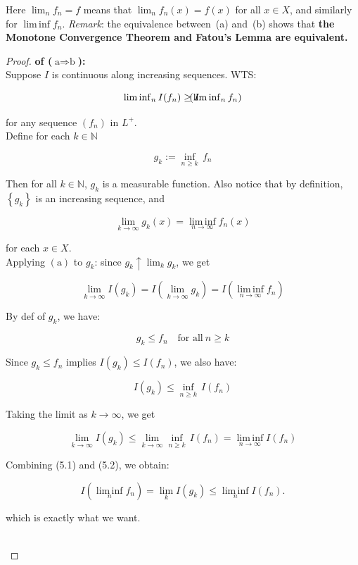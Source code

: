\documentclass{qlnotes-export}
\begin{document}
Here \(\lim_{n}f_{n} = f\) means that \(\lim_{n}f_{n}(x) = f(x)\) for all \(x \in X\), and similarly for \(\operatorname{lim\, inf}f_{n}\). \emph{Remark}: the equivalence between~(a) and~(b) shows that \textbf{the Monotone Convergence Theorem and Fatou's Lemma are equivalent.}

\begin{proof}

\textbf{of (\(\text{a}\Longrightarrow\text{b}\)):}\\
Suppose \(I\) is continuous along increasing sequences. WTS:

\[\operatorname{lim\, inf}\limits_{n}I(f_{n}) \geq I\mspace{-18mu}(\operatorname{lim\, inf}\limits_{n}f_{n})\]

for any sequence \((f_{n})\) in \(L^{+}\).\\
Define for each \(k \in {\mathbb{N}}\)

\[g_{k} := \inf\limits_{n \geq k}\, f_{n}\]

Then for all \(k \in {\mathbb{N}}\), \(g_{k}\) is a measurable function. Also notice that by definition, \(\left\{ g_{k} \right\}\) is an increasing sequence, and

\[\lim\limits_{k\rightarrow\infty}g_{k}(x) = \operatorname{lim\, inf}\limits_{n\rightarrow\infty}f_{n}(x)\]

for each \(x \in X\).\\
Applying \((\text{a})\) to \(g_{k}\): since \(g_{k} \uparrow \lim_{k}g_{k}\), we get

\[\lim\limits_{k\rightarrow\infty}I(g_{k}) = I(\lim\limits_{k\rightarrow\infty}g_{k}) = I(\operatorname{lim\, inf}\limits_{n\rightarrow\infty}f_{n})\]

By def of \(g_{k}\), we have:

\[g_{k} \leq f_{n}\quad\text{for all}\ n \geq k\]

Since \(g_{k} \leq f_{n}\) implies \(I(g_{k}) \leq I(f_{n})\), we also have:

\[I(g_{k}) \leq \inf\limits_{n \geq k}\, I(f_{n})\]

Taking the limit as \(k\rightarrow\infty\), we get

\[\lim\limits_{k\rightarrow\infty}I(g_{k}) \leq \lim\limits_{k\rightarrow\infty}\inf\limits_{n \geq k}\, I(f_{n}) = \operatorname{lim\, inf}\limits_{n\rightarrow\infty}I(f_{n})\]

Combining (5.1) and (5.2), we obtain:

\[I(\operatorname{lim\, inf}\limits_{n}f_{n}) = \lim\limits_{k}I(g_{k}) \leq \operatorname{lim\, inf}\limits_{n}I(f_{n}).\]

which is exactly what we want.\\
\strut \\

\end{proof}
\end{document}
